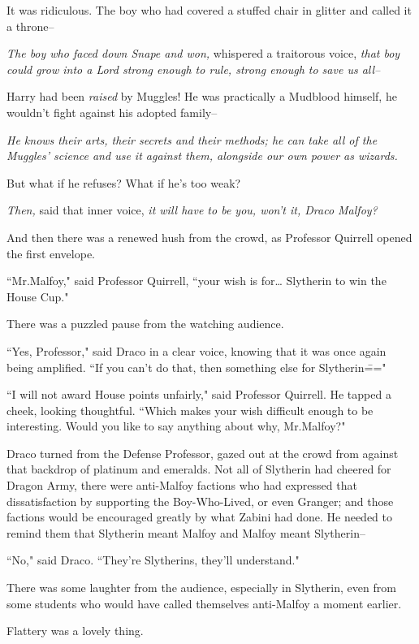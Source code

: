 It was ridiculous. The boy who had covered a stuffed chair in glitter and called it a throne\---

\emph{The boy who faced down Snape and won,} whispered a traitorous voice, \emph{that boy could grow into a Lord strong enough to rule, strong enough to save us all\---}

Harry had been \emph{raised} by Muggles! He was practically a Mudblood himself, he wouldn't fight against his adopted family\---

\emph{He knows their arts, their secrets and their methods; he can take all of the Muggles' science and use it against them, alongside our own power as wizards.}

But what if he refuses? What if he's too weak?

\emph{Then,} said that inner voice, \emph{it will have to be you, won't it, Draco Malfoy?}

And then there was a renewed hush from the crowd, as Professor Quirrell opened the first envelope.

``Mr.\?Malfoy," said Professor Quirrell, ``your wish is for{\ldots} Slytherin to win the House Cup."

There was a puzzled pause from the watching audience.

``Yes, Professor," said Draco in a clear voice, knowing that it was once again being amplified. ``If you can't do that, then something else for Slytherin\==="

``I will not award House points unfairly," said Professor Quirrell. He tapped a cheek, looking thoughtful. ``Which makes your wish difficult enough to be interesting. Would you like to say anything about why, Mr.\?Malfoy?"

Draco turned from the Defense Professor, gazed out at the crowd from against that backdrop of platinum and emeralds. Not all of Slytherin had cheered for Dragon Army, there were anti-Malfoy factions who had expressed that dissatisfaction by supporting the Boy-Who-Lived, or even Granger; and those factions would be encouraged greatly by what Zabini had done. He needed to remind them that Slytherin meant Malfoy and Malfoy meant Slytherin\---

``No," said Draco. ``They're Slytherins, they'll understand."

There was some laughter from the audience, especially in Slytherin, even from some students who would have called themselves anti-Malfoy a moment earlier.

Flattery was a lovely thing.

